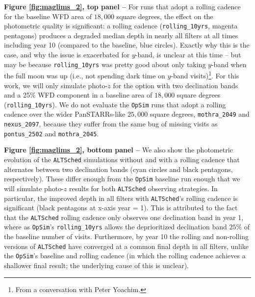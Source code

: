 {\bf Figure \ref{fig:maglims_2}, top panel --} For runs that adopt a rolling cadence for the baseline WFD area of $18,000$ square degrees, the effect on the photometric quality is significant: a rolling cadence ({\tt rolling\_10yrs}, magenta pentagons) produces a degraded median depth in nearly all filters at all times including year 10 (compared to the baseline, blue circles). Exactly why this is the case, and why the issue is exacerbated for $y$-band, is unclear at this time -- but may be because {\tt rolling\_10yrs} was pretty good about only taking $y$-band when the full moon was up (i.e., not spending dark time on $y$-band visits)\footnote{From a conversation with Peter Yoachim.}. For this work, we will only simulate photo-$z$ for the option with two declination bands and a 25\% WFD component in a baseline area of $18,000$ square degrees ({\tt rolling\_10yrs}). We do not evaluate the {\tt OpSim} runs that adopt a rolling cadence over the wider PanSTARRs-like $25,000$ square degrees, {\tt mothra\_2049} and {\tt nexus\_2097}, because they suffer from the same bug of missing visits as {\tt pontus\_2502} and {\tt mothra\_2045}.

{\bf Figure \ref{fig:maglims_2}, bottom panel --} We also show the photometric evolution of the {\tt ALTSched} simulations without and with a rolling cadence that alternates between two declination bands (cyan circles and black pentagons, respectively). These differ enough from the {\tt OpSim} baseline run enough that we will simulate photo-$z$ results for both {\tt ALTSched} observing strategies. In particular, the improved depth in all filters with {\tt ALTSched}'s rolling cadence is significant (black pentagons at x-axis year = 1). This is attributed to the fact that the {\tt ALTSched} rolling cadence only observes one declination band in year 1, where as {\tt OpSim}'s {\tt rolling\_10yrs} allows the deprioritized declination band $25\%$ of the baseline number of visits. Furthermore, by year 10 the rolling and non-rolling versions of {\tt ALTSched} have converged at a common final depth in all filters, unlike the {\tt OpSim}'s baseline and rolling cadence (in which the rolling cadence achieves a shallower final result; the underlying cause of this is unclear).

